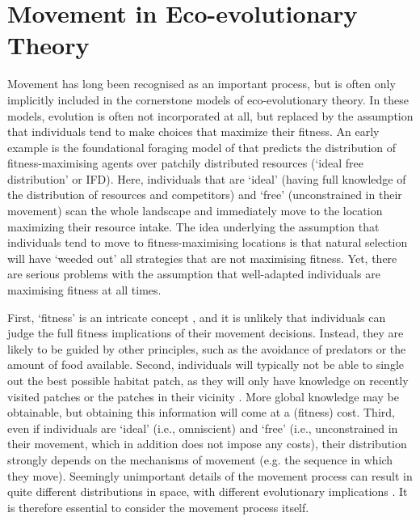 \section*{Movement in Eco-evolutionary Theory}

Movement has long been recognised as an important process, but is often only implicitly included in the cornerstone models of eco-evolutionary theory.
In these models, evolution is often not incorporated at all, but replaced by the assumption that individuals tend to make choices that maximize their fitness. 
An early example is the foundational foraging model of \textcite{fretwell1970} that predicts the distribution of fitness-maximising agents over patchily distributed resources (`ideal free distribution' or IFD). Here, individuals that are `ideal' (having full knowledge of the distribution of resources and competitors) and `free' (unconstrained in their movement) scan the whole landscape and immediately move to the location maximizing their resource intake. 
The idea underlying the assumption that individuals tend to move to fitness-maximising locations is that natural selection will have `weeded out' all strategies that are not maximising fitness.
Yet, there are serious problems with the assumption that well-adapted individuals are maximising fitness at all times.

First, `fitness' is an intricate concept \parencite{brommer2000}, and it is unlikely that individuals can judge the full fitness implications of their movement decisions. 
Instead, they are likely to be guided by other principles, such as the avoidance of predators or the amount of food available. 
Second, individuals will typically not be able to single out the best possible habitat patch, as they will only have knowledge on recently visited patches or the patches in their vicinity \parencite{robira2021}. 
More global knowledge may be obtainable, but obtaining this information will come at a (fitness) cost. 
Third, even if individuals are `ideal' (i.e., omniscient) and `free' (i.e., unconstrained in their movement, which in addition does not impose any costs), their distribution strongly depends on the mechanisms of movement (e.g. the sequence in which they move). 
Seemingly unimportant details of the movement process can result in quite different distributions in space, with different evolutionary implications \parencite{houston1998a,netz2022b}. 
It is therefore essential to consider the movement process itself.

